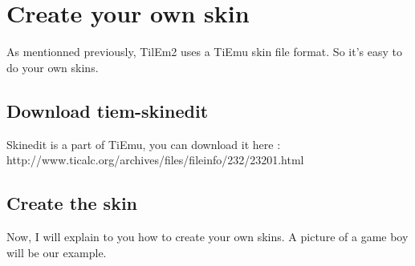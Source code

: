 \documentclass[10pt]{report}
\begin{document}
\chapter{Create your own skin}

As mentionned previously, TilEm2 uses a TiEmu skin file format.\newline
So it's easy to do your own skins.\newline

\section{Download tiem-skinedit}

Skinedit is a part of TiEmu, you can download it here :\newline
http://www.ticalc.org/archives/files/fileinfo/232/23201.html\newline

\section{Create the skin}
Now, I will explain to you how to create your own skins.\newline
A picture of a game boy will be our example.\newline
\end{document}
